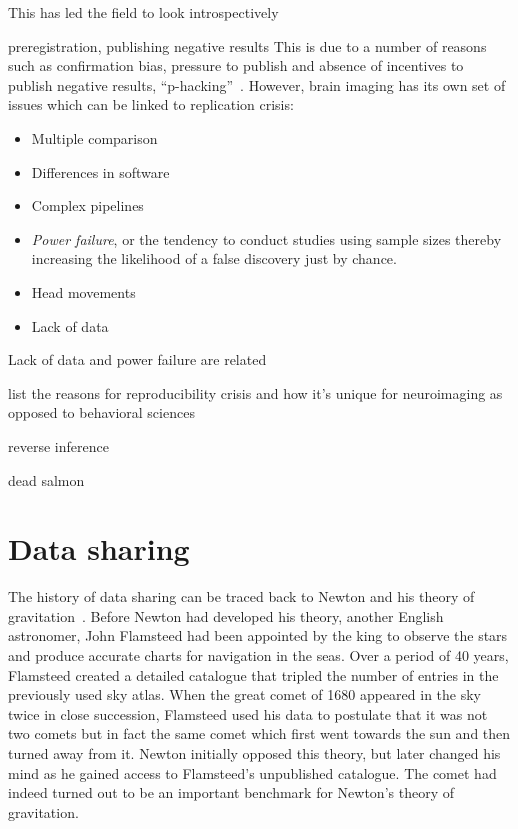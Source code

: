This has led the field to look introspectively

preregistration, publishing negative results
 This is due to a number of reasons such as confirmation bias, pressure to publish and absence of incentives to publish negative results, ``p-hacking''~\citep{simmons2011false}. However, brain imaging has its own set of issues which can be linked to replication crisis:


\begin{itemize}[noitemsep,nolistsep]
\item Multiple comparison
\item Differences in software
\item Complex pipelines~\citep{Carp2012289}
\item \emph{Power failure}, or the tendency to conduct studies using sample sizes thereby increasing the likelihood of a false discovery just by chance.
\item Head movements~\citep{yendiki2014spurious}
\item Lack of data
\end{itemize}

Lack of data and power failure are related

list the reasons for reproducibility crisis and how it's unique for neuroimaging as opposed to behavioral sciences

reverse inference

dead salmon~\citep{bennett2009neural}

\section{Data sharing}
The history of data sharing can be traced back to Newton and his theory of gravitation~\citep{pointofview2013}. Before Newton had developed his theory, another English astronomer, John Flamsteed had been appointed by the king to observe the stars and produce accurate charts for navigation in the seas. Over a period of 40 years, Flamsteed created a detailed catalogue that tripled the number of entries in the previously used sky atlas. When the great comet of 1680 appeared in the sky twice in close succession, Flamsteed used his data to postulate that it was not two comets but in fact the same comet which first went towards the sun and then turned away from it. Newton initially opposed this theory, but later changed his mind as he gained access to Flamsteed's unpublished catalogue. The comet had indeed turned out to be an important benchmark for Newton's theory of gravitation.

